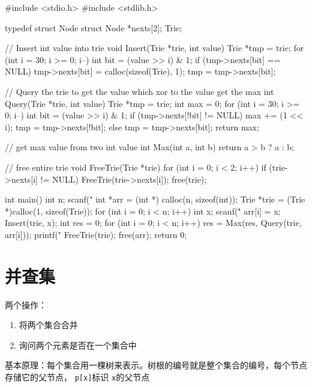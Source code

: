 \begin{mycpptwocol}[链表形式的Trie]
#include <stdio.h>
#include <stdlib.h>

typedef struct Node {
    struct Node *nexts[2];
} Trie;

// Insert int value into trie
void Insert(Trie *trie, int value) {
    Trie *tmp = trie;
    for (int i = 30; i >= 0; i--) {
        int bit = (value >> i) & 1;
        if (tmp->nexts[bit] == NULL) {
            tmp->nexts[bit] = calloc(sizeof(Trie), 1);
        }
        tmp = tmp->nexts[bit];
    }
}

// Query the trie to get the value which xor to the value get the max
int Query(Trie *trie, int value) {
    Trie *tmp = trie;
    int max = 0;
    for (int i = 30; i >= 0; i--) {
        int bit = (value >> i) & 1;
        if (tmp->nexts[!bit] != NULL) {
            max += (1 << i);
            tmp = tmp->nexts[!bit];
        } else {
            tmp = tmp->nexts[bit];
        }
    }
    return max;
}

// get max value from two int value
int Max(int a, int b) {
    return a > b ? a : b;
}

// free entire trie
void FreeTrie(Trie *trie) {
    for (int i = 0; i < 2; i++) {
        if (trie->nexts[i] != NULL) {
            FreeTrie(trie->nexts[i]);
        }
    }
    free(trie);
}

int main()
{
    int n;
    scanf("%
    int *arr = (int *) calloc(n, sizeof(int));
    Trie *trie = (Trie *)calloc(1, sizeof(Trie));
    for (int i = 0; i < n; i++) {
        int x;
        scanf("%
        arr[i] = x;
        Insert(trie, x);
    }
    int res = 0;
    for (int i = 0; i < n; i++) {
        res = Max(res, Query(trie, arr[i]));
    }
    printf("%
    FreeTrie(trie);
    free(arr);
    return 0;
}
\end{mycpptwocol}

\section{并查集}

两个操作：

\begin{enumerate}
    \item 将两个集合合并
    \item 询问两个元素是否在一个集合中
\end{enumerate}

基本原理：每个集合用一棵树来表示。树根的编号就是整个集合的编号，每个节点存储它的父节点， \lstinline{p[x]}标识 \lstinline{x}的父节点

